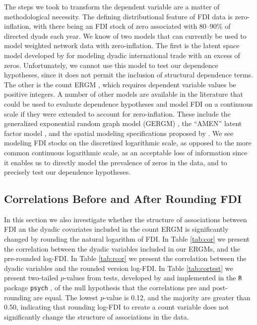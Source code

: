 \documentclass[reqno,onecolumn,letterpaper,12pt]{article}
\newcommand{\R}{\texttt{R}} %
\begin{document}
The steps we took to transform the dependent variable are a matter of methodological necessity.  The defining distributional feature of FDI data is zero-inflation, with there being an FDI stock of zero associated with 80--90\% of directed dyads each year. We know of two models that can currently be used to model weighted network data with zero-inflation. The first is the latent space model developed by \cite{ward2013gravity} for modeling dyadic international trade with an excess of zeros. Unfortunately, we cannot use this model to test our dependence hypotheses, since it does not permit the inclusion of structural dependence terms. The other is the count ERGM \citep{krivitsky2012exponential}, which requires dependent variable values be positive integers. A number of other models are available in the literature that could be used to evaluate dependence hypotheses and model FDI on a continuous scale if they were extended to account for zero-inflation. These include the generalized exponential random graph model (GERGM) \citep{wilson2017stochastic},  the ``AMEN'' latent factor model \citep{minhas2019inferential}, and the spatial modeling specifications proposed by \cite{neumayer2010spatial}.  We see modeling FDI stocks on the discretized logarithmic scale, as opposed to the more common continuous logarithmic scale, as an acceptable loss of information since it enables us to directly model the prevalence of zeros in the data, and to precisely test our dependence hypotheses.



\subsection*{Correlations Before and After Rounding FDI}

In this section we also investigate whether the structure of associations between FDI an the dyadic covariates included in the count ERGM is significantly changed by rounding the natural logarithm of FDI. In Table \ref{tab:cor} we present the correlation between the dyadic variables included in our ERGMs, and the pre-rounded log-FDI. In Table \ref{tab:rcor} we present the correlation between the dyadic variables and the rounded version log-FDI. In Table \ref{tab:cortest} we present two-tailed $p$-values from tests, developed by \cite{dunn1969correlation} and implemented in the \R~ package \texttt{psych} \citep{psych}, of the null hypothesis that the correlations pre and post-rounding are equal. The lowest $p$-value is 0.12, and the majority are greater than 0.50, indicating that rounding log-FDI to create a count variable does not significantly change the structure of associations in the data.
\end{document}
